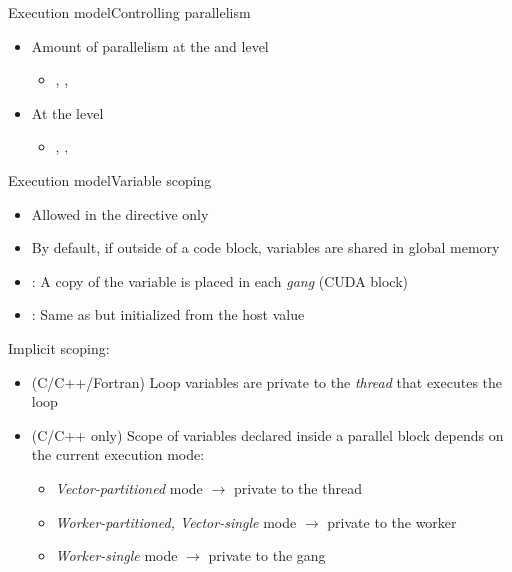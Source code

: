 \documentclass[12pt,aspectratio=169]{beamer}
\begin{document}
\begin{frame}[fragile]{Execution model}{Controlling parallelism}
  \begin{itemize}
  \item Amount of parallelism at the  and
     level
    \begin{itemize}
    \item {}, ,
    \end{itemize}
  \item At the  level
    \begin{itemize}
    \item {}, , 
    \end{itemize}
  \end{itemize}

\end{frame}

\begin{frame}[fragile]{Execution model}{Variable scoping}
  \begin{itemize}
  \item Allowed in the  directive only
  \item By default, if outside of a code block, variables are shared in global memory
  \item {}: A copy of the variable is placed in each \emph{gang} (CUDA block)
  \item {}: Same as  but initialized from the host value
  \end{itemize}
  \pause
  Implicit scoping:
  \begin{itemize}
  \item (C/C++/Fortran) Loop variables are private to the \emph{thread} that executes the loop
  \item (C/C++ only) Scope of variables declared inside a parallel block depends on the current execution mode:
    \begin{itemize}
    \item \emph{Vector-partitioned} mode $\rightarrow$ private to the thread
    \item \emph{Worker-partitioned, Vector-single} mode $\rightarrow$ private to the worker
    \item \emph{Worker-single} mode $\rightarrow$ private to the gang
    \end{itemize}
  \end{itemize}
\end{frame}
\end{document}
